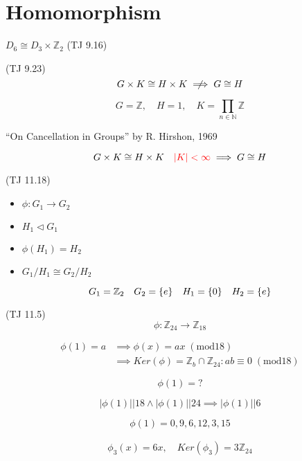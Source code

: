 \section{Homomorphism}

\begin{frame}{$D_6 \cong D_3 \times \mathbb{Z}_{2}$ (TJ 9.16)}
\end{frame}

\begin{frame}{(TJ 9.23)}
  \[
    G \times K \cong H \times K \centernot\implies G \cong H
  \]

  \[
    G = \mathbb{Z}, \quad H = {1}, \quad K = \prod_{n \in \mathbb{N}} \mathbb{Z}
  \]

  \centerline{``On Cancellation in Groups'' by R. Hirshon, 1969}

  \[
    G \times K \cong H \times K \quad \textcolor{red}{|K| < \infty} \implies G \cong H
  \]
\end{frame}
\begin{frame}{(TJ 11.18)}
  \begin{itemize}
    \item $\phi: G_1 \to G_2$
    \item $H_1 \triangleleft G_1$
    \item $\phi(H_1) = H_2$
    \item $G_1/H_1 \cong G_2/H_2$
  \end{itemize}

  \[
    G_1 = \mathbb{Z}_{2} \quad G_2 = \{e\} \quad H_1 = \{0\} \quad H_2 = \{e\}
  \]
\end{frame}
\begin{frame}{(TJ 11.5)}
  \[
    \phi: \mathbb{Z}_{24} \to \mathbb{Z}_{18}
  \]

  \begin{align*}
    \phi(1) = a & \implies \phi(x) = ax\; (\mathrm{mod} 18) \\
	    & \implies Ker(\phi) = \mathbb{Z}_{b} \cap \mathbb{Z}_{24}: ab \equiv 0\; (\mathrm{mod} 18)
  \end{align*}

  \[
    \phi(1) = ?
  \]

  \[
    |\phi(1)| | 18 \land |\phi(1)| | 24 \implies |\phi(1)| | 6
  \]

  \[
    \phi(1) = 0, 9, 6, 12, 3, 15
  \]

  \begin{align*}
    \phi_3(x) = 6x, \quad Ker(\phi_{3}) = 3\mathbb{Z}_{24}
  \end{align*}
\end{frame}
